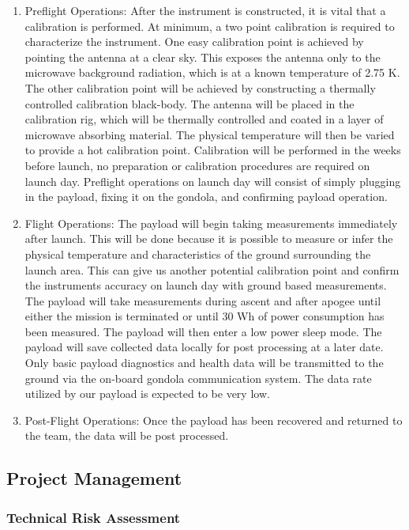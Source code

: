 \documentclass[12pt]{article}
\begin{document}
\begin{enumerate}
    \item Preflight Operations: After the instrument is constructed, it is vital that a calibration is performed. At minimum, a two point calibration is required to characterize the instrument. One easy calibration point is achieved by pointing the antenna at a clear sky. This exposes the antenna only to the microwave background radiation, which is at a known temperature of 2.75 \textdegree K. The other calibration point will be achieved by constructing a thermally controlled calibration black-body. The antenna will be placed in the calibration rig, which will be thermally controlled and coated in a layer of microwave absorbing material. The physical temperature will then be varied to provide a hot calibration point. Calibration will be performed in the weeks before launch, no preparation or calibration procedures are required on launch day. Preflight operations on launch day will consist of simply plugging in the payload, fixing it on the gondola, and confirming payload operation.
    \item Flight Operations: The payload will begin taking measurements immediately after launch. This will be done because it is possible to measure or infer the physical temperature and characteristics of the ground surrounding the launch area. This can give us another potential calibration point and confirm the instruments accuracy on launch day with ground based measurements. The payload will take measurements during ascent and after apogee until either the mission is terminated or until 30 Wh of power consumption has been measured. The payload will then enter a low power sleep mode. The payload will save collected data locally for post processing at a later date. Only basic payload diagnostics and health data will be transmitted to the ground via the on-board gondola communication system. The data rate utilized by our payload is expected to be very low.
    \item Post-Flight Operations: Once the payload has been recovered and returned to the team, the data will be post processed.
\end{enumerate}

\subsection{Project Management}

\subsubsection{Technical Risk Assessment}
\end{document}
